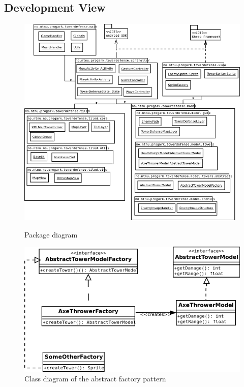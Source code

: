 \documentclass[a4paper, 11pt]{article}
\begin{document}
\subsection{Development View}
\begin{figure}[h]
\center
\includegraphics[width=1\linewidth ]{images/packageDiagram}
\label{fig:packagediagram}
\caption{Package diagram}
\end{figure}
\begin{figure}[h]
\includegraphics[width=1\linewidth]{images/abstractFactory.png}
\caption{Class diagram of the abstract factory pattern}
\label{fig:absfac}
\end{figure}
\clearpage


\end{document}
